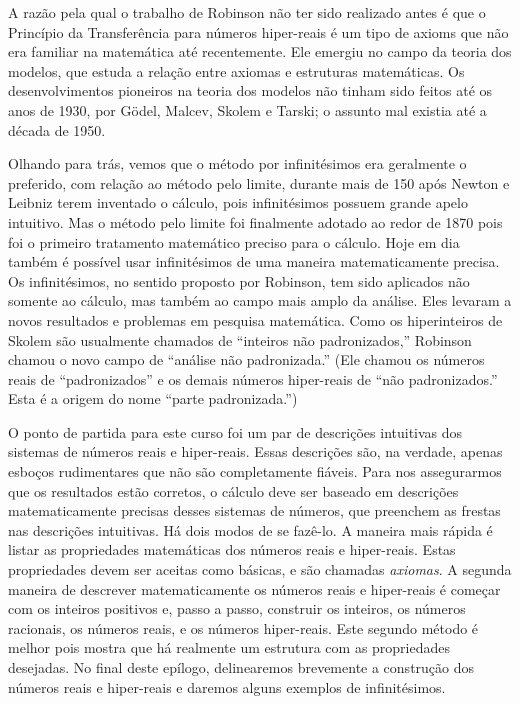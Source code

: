 A razão pela qual o trabalho de Robinson não ter sido realizado antes é
que o Princípio da Transferência para números hiper-reais é um tipo de
axioms que não era familiar na matemática até recentemente. Ele emergiu
no campo da teoria dos modelos, que estuda a relação entre axiomas e
estruturas matemáticas. Os desenvolvimentos pioneiros na teoria dos
modelos não tinham sido feitos até os anos de 1930, por Gödel, Malcev,
Skolem e Tarski; o assunto mal existia até a década de 1950.

Olhando para trás, vemos que o método por infinitésimos era geralmente
o preferido, com relação ao método pelo limite, durante mais de 150 após
Newton e Leibniz terem inventado o cálculo, pois infinitésimos possuem
grande apelo intuitivo. Mas o método pelo limite foi finalmente adotado
ao redor de 1870 pois foi o primeiro tratamento matemático preciso para
o cálculo. Hoje em dia também é possível usar infinitésimos de uma
maneira matematicamente precisa. Os infinitésimos, no sentido proposto
por Robinson, tem sido aplicados não somente ao cálculo, mas também
ao campo mais amplo da análise. Eles levaram a novos resultados e
problemas em pesquisa matemática. Como os hiperinteiros de Skolem são
usualmente chamados de ``inteiros não padronizados,'' Robinson chamou
o novo campo de ``análise não padronizada.'' (Ele chamou os números
reais de ``padronizados'' e os demais números hiper-reais de
``não padronizados.'' Esta é a origem do nome ``parte padronizada.'')

O ponto de partida para este curso foi um par de descrições intuitivas
dos sistemas de números reais e hiper-reais. Essas descrições são,
na verdade, apenas esboços rudimentares que não são completamente
fiáveis. Para nos assegurarmos que os resultados estão corretos, o
cálculo deve ser baseado em descrições matematicamente precisas desses
sistemas de números, que preenchem as frestas nas descrições intuitivas.
Há dois modos de se fazê-lo. A maneira mais rápida é listar as propriedades
matemáticas dos números reais e hiper-reais. Estas propriedades devem ser
aceitas como básicas, e são chamadas \emph{axiomas}. A segunda maneira
de descrever matematicamente os números reais e hiper-reais é começar com
os inteiros positivos e, passo a passo, construir os inteiros, os 
números racionais, os números reais, e os números hiper-reais. Este
segundo método é melhor pois mostra que há realmente um estrutura com as
propriedades desejadas. No final deste epílogo, delinearemos brevemente a
construção dos números reais e hiper-reais e daremos alguns exemplos de
infinitésimos.

